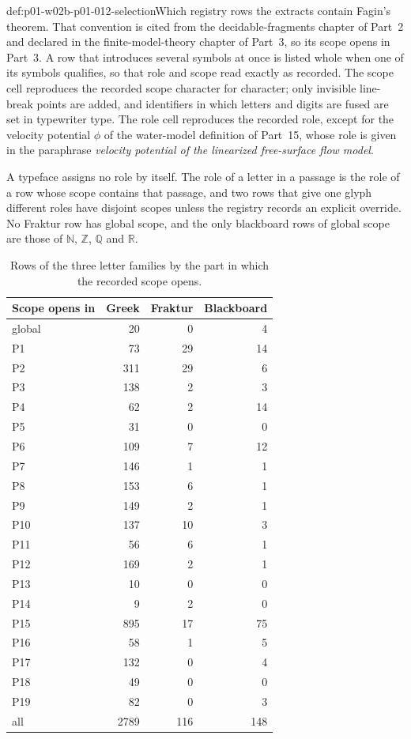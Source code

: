 \begin{hbconvention}{def:p01-w02b-p01-012-selection}{Which registry rows the extracts contain}
Fagin's theorem.  That convention is cited from the decidable-fragments
chapter of Part~2 and declared in the finite-model-theory chapter of
Part~3, so its scope opens in Part~3.  A row that introduces several
symbols at once is listed whole when one of its symbols qualifies, so that
role and scope read exactly as recorded.  The scope cell reproduces the
recorded scope character for character; only invisible line-break points
are added, and identifiers in which letters and digits are fused are set
in typewriter type.  The role cell reproduces the recorded role, except
for the velocity potential \(\phi\) of the water-model definition of
Part~15, whose role is given in the paraphrase \emph{velocity potential of
the linearized free-surface flow model}.
\end{hbconvention}

A typeface assigns no role by itself.  The role of a letter in a passage is
the role of a row whose scope contains that passage, and two rows that give
one glyph different roles have disjoint scopes unless the registry records
an explicit override.  No Fraktur row has global scope, and the only
blackboard rows of global scope are those of \(\mathbb N\), \(\mathbb Z\),
\(\mathbb Q\) and \(\mathbb R\).

\begin{table}[ht]
\centering\small
\caption{Rows of the three letter families by the part in which the
recorded scope opens.}
\label{tab:p01-w02b-p01-012-counts}
\begin{tabular}{@{}lrrr@{}}
\toprule
Scope opens in & Greek & Fraktur & Blackboard \\
\midrule
global & 20 & 0 & 4 \\
P1 & 73 & 29 & 14 \\
P2 & 311 & 29 & 6 \\
P3 & 138 & 2 & 3 \\
P4 & 62 & 2 & 14 \\
P5 & 31 & 0 & 0 \\
P6 & 109 & 7 & 12 \\
P7 & 146 & 1 & 1 \\
P8 & 153 & 6 & 1 \\
P9 & 149 & 2 & 1 \\
P10 & 137 & 10 & 3 \\
P11 & 56 & 6 & 1 \\
P12 & 169 & 2 & 1 \\
P13 & 10 & 0 & 0 \\
P14 & 9 & 2 & 0 \\
P15 & 895 & 17 & 75 \\
P16 & 58 & 1 & 5 \\
P17 & 132 & 0 & 4 \\
P18 & 49 & 0 & 0 \\
P19 & 82 & 0 & 3 \\
\midrule
all & 2789 & 116 & 148 \\
\bottomrule
\end{tabular}
\end{table}

